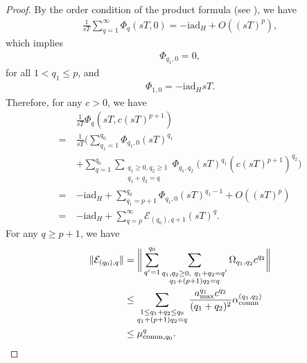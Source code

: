 \documentclass[aps,pra,reprint,groupedaddress,floatfix]{revtex4-2}
\renewcommand{\i}{\mathrm{i}}
\renewcommand{\L}{\mathcal{L}}
\newcommand{\ad}{\mathrm{ad}}
\newcommand{\E}{\mathcal{E}}
\begin{document}
\begin{proof}
    By the order condition of the product formula (see \citep[Lemma 2]{watson2025exponentially}), we have \begin{align*}
        \frac{1}{sT}\sum_{q=1}^{\infty} \Phi_{q}(sT,0) = -\i \ad_H + O((sT)^p),
    \end{align*}
    which implies \begin{align*}
        \Phi_{q_1, 0} = 0,
    \end{align*}
    for all $1 <q_1 \le p$, and \begin{align*}
        \Phi_{1,0} = - \i \ad_H sT.
    \end{align*} 
    Therefore, for any $c>0$, we have
    \begin{align*}
        & \frac{1}{sT} \Phi_{q}(sT,c(sT)^{p+1}) \\
        =~& \frac{1}{sT}\Big(\sum_{q_1=1}^{q_0}\Phi_{q_1, 0}(sT)^{q_1} \\
        & + \sum_{q = 1}^{q_0}\sum_{\substack{q_1\ge 0,q_2\ge 1\\ q_1+q_2 = q}} \Phi_{q_1, q_2} (sT)^{q_1}(c(sT)^{p+1})^{q_2}\Big) \\
        =~& -\i \ad_H + \sum_{q_1 = p+1}^{q_0} \Phi_{q_1, 0} (sT)^{q_1-1} + O((sT)^{p}) \\
        =~& -\i \ad_H + \sum_{q = p}^{\infty} \E_{(q_0),q+1} (sT)^{q}.
    \end{align*}
    For any $q\ge p+1$, we have
    \begin{align*}
        \|\E_{(q_0),q}\| &= \bigg\|\sum_{q'=1}^{q_0}\sum_{\substack{q_1, q_2\ge 0,~ q_1+q_2=q' \\
        q_1+(p+1)q_2 = q}} \Omega_{q_1,q_2} c^{q_2} \bigg\|\\
        &\le \sum_{\substack{1\le q_1+ q_2\le q_0 \\
        q_1+(p+1)q_2 = q}}\frac{a_{\max}^{q_1}c^{q_2}}{(q_1+q_2)^2} \alpha_{\rm comm}^{(q_1, q_2)} \\
        &\le  \mu_{\mathrm{comm},q_0}^q.
    \end{align*}
\end{proof}
\end{document}
